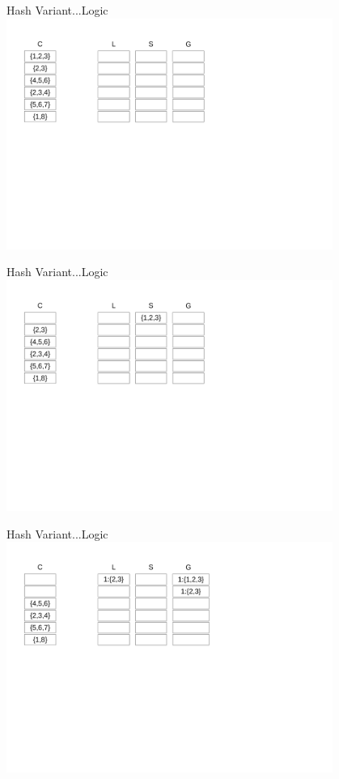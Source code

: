 \documentclass{beamer}
\begin{document}
\begin{frame}{Hash Variant...}{Logic}
    \centering
    \includegraphics[trim={1cm 10cm 11cm 1cm}, clip,width=0.8\textwidth]{figures/L1} 
\end{frame}
\begin{frame}{Hash Variant...}{Logic}
    \centering
    \includegraphics[trim={1cm 10cm 11cm 1cm}, clip,width=0.8\textwidth]{figures/L2} 
\end{frame}
\begin{frame}{Hash Variant...}{Logic}
    \centering
    \includegraphics[trim={1cm 10cm 11cm 1cm}, clip,width=0.8\textwidth]{figures/L3} 
\end{frame}
\end{document}
